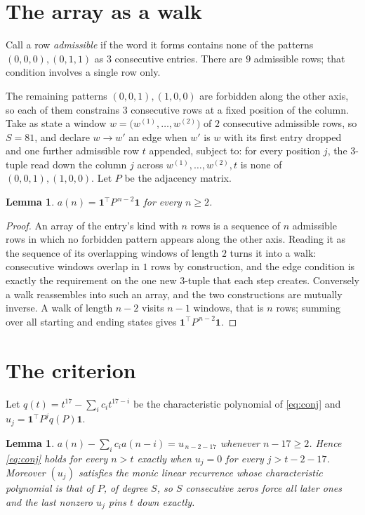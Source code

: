 \documentclass[11pt,a4paper]{article}
\theoremstyle{plain}
\newtheorem{lemma}[theorem]{Lemma}
\theoremstyle{definition}
\begin{document}
\section{The array as a walk}

Call a row \emph{admissible} if the word it forms contains none of the patterns
$(0,0,0), (0,1,1)$ as $3$ consecutive entries. There are $9$ admissible rows; that condition
involves a single row only.

The remaining patterns $(0,0,1), (1,0,0)$ are forbidden along the other axis, so each of them
constrains $3$ consecutive rows at a fixed position of the column. Take as state a
window $w=\bigl(w^{(1)},\dots,w^{(2)}\bigr)$ of $2$ consecutive admissible
rows, so $S=81$, and declare $w\to w'$ an edge when $w'$ is $w$ with its first entry
dropped and one further admissible row $t$ appended, subject to: for every position
$j$, the $3$-tuple read down the column $j$ across $w^{(1)},\dots,w^{(2)},t$
is none of $(0,0,1), (1,0,0)$. Let $P$ be the adjacency matrix.

\begin{lemma}\label{lem:walk}
$a(n)=\mathbf{1}^{\!\top}P^{\,n-2}\mathbf{1}$ for every $n\ge2$.
\end{lemma}

\begin{proof}
An array of the entry's kind with $n$ rows is a sequence of $n$ admissible rows in
which no forbidden pattern appears along the other axis. Reading it as the sequence of its
overlapping windows of length $2$ turns it into a walk: consecutive windows overlap in
$1$ rows by construction, and the edge condition is exactly the requirement on the one
new $3$-tuple that each step creates. Conversely a walk reassembles into such an array,
and the two constructions are mutually inverse. A walk of length $n-2$ visits $n-1$
windows, that is $n$ rows; summing over all starting and ending states gives
$\mathbf{1}^{\!\top}P^{\,n-2}\mathbf{1}$.
\end{proof}

\section{The criterion}

Let $q(t)=t^{17}-\sum_i c_i t^{17-i}$ be the characteristic polynomial of
\eqref{eq:conj} and $u_j=\mathbf{1}^{\!\top}P^{j}q(P)\mathbf{1}$.

\begin{lemma}\label{lem:crit}
$a(n)-\sum_i c_i a(n-i)=u_{\,n-2-17}$ whenever $n-17\ge2$. Hence
\eqref{eq:conj} holds for every $n>t$ exactly when $u_j=0$ for every
$j>t-2-17$. Moreover $(u_j)$ satisfies the monic linear recurrence whose
characteristic polynomial is that of $P$, of degree $S$, so $S$ consecutive zeros force all
later ones and the last nonzero $u_j$ pins $t$ down exactly.
\end{lemma}
\end{document}
